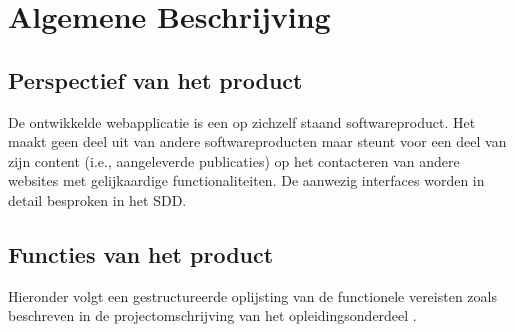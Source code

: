 \documentclass{article}
\begin{document}
\clearpage

\section{Algemene Beschrijving}

\subsection{Perspectief van het product}
De ontwikkelde webapplicatie is een op zichzelf staand softwareproduct. Het maakt geen deel uit van andere softwareproducten maar steunt voor een deel van zijn content (i.e., aangeleverde publicaties) op het contacteren van andere websites met gelijkaardige functionaliteiten. De aanwezig interfaces worden in detail besproken in het SDD. 

\subsection{Functies van het product}
\label{subsec:userRequirements}

Hieronder volgt een gestructureerde oplijsting van de functionele vereisten zoals beschreven in de projectomschrijving van het opleidingsonderdeel \cite{Xtreport:organisatie}.

\renewcommand{\labelitemi}{$\diamond$}
\renewcommand{\labelitemii}{$\bullet$}
\renewcommand{\labelitemiii}{$\cdot$}
\end{document}

